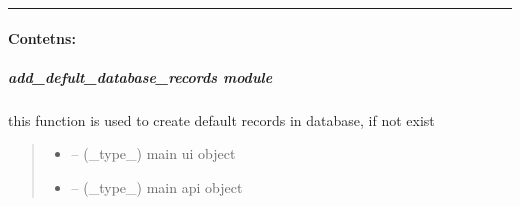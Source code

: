 \documentclass[letterpaper,10pt,english]{sphinxmanual}
\begin{document}
\bigskip\hrule\bigskip



\paragraph{Contetns:}
\label{\detokenize{setting/backend Dir:contetns}}
\sphinxstepscope


\subparagraph{add\_defult\_database\_records module}
\label{\detokenize{setting/backend/add_default_database_records:module-oxin.backend.add_default_database_records}}\label{\detokenize{setting/backend/add_default_database_records:add-defult-database-records-module}}\label{\detokenize{setting/backend/add_default_database_records::doc}}

\begin{savenotes}\begin{fulllineitems}
\label{\detokenize{setting/backend/add_default_database_records:oxin.backend.add_default_database_records.create_default_records}}
\pysigstartsignatures
{}
\pysigstopsignatures
\sphinxAtStartPar
this function is used to create default records in database, if not exist
\begin{quote}\begin{description}
\begin{itemize}
\item {} 
\sphinxAtStartPar
{} – (\_type\_) main ui object

\item {} 
\sphinxAtStartPar
{} – (\_type\_) main api object

\end{itemize}

\end{description}\end{quote}

\end{fulllineitems}\end{savenotes}
\end{document}
